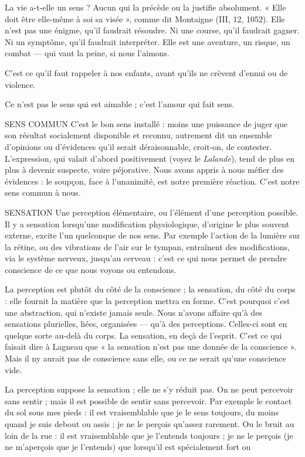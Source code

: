 La vie a-t-elle un sens ? Aucun qui la précède ou la justifie absolument.
« Elle doit être elle-même à soi sa visée », comme dit Montaigne (III, 12,
1052). Elle n’est pas une énigme, qu’il faudrait résoudre. Ni une course, qu’il
faudrait gagner. Ni un symptôme, qu’il faudrait interpréter. Elle est une aventure,
un risque, un combat — qui vaut la peine, si nous l’aimons.

C’est ce qu’il faut rappeler à nos enfants, avant qu’ils ne crèvent d’ennui ou
de violence.

Ce n’est pas le sens qui est aimable ; c’est l'amour qui fait sens.

SENS COMMUN C'est le bon sens installé : moins une puissance de juger
que son résultat socialement disponible et reconnu, autrement
dit un ensemble d’opinions ou d’évidences qu’il serait déraisonnable,
croit-on, de contester. L'expression, qui valait d’abord positivement (voyez le
{\it Lalande}), tend de plus en plus à devenir suspecte, voire péjorative. Nous avons
appris à nous méfier des évidences : le soupçon, face à l’unanimité, est notre
première réaction. C’est notre sens commun à nous.

SENSATION Une perception élémentaire, ou l'élément d’une perception
possible. Il y a sensation lorsqu'une modification physiologique,
d’origine le plus souvent externe, excite l’un quelconque de nos sens. Par
exemple l’action de la lumière sur la rétine, ou des vibrations de l'air sur le
tympan, entraînent des modifications, via le système nerveux, jusqu’au
cerveau : c’est ce qui nous permet de prendre conscience de ce que nous voyons
ou entendons.

La perception est plutôt du côté de la conscience ; la sensation, du côté du
corps : elle fournit la matière que la perception mettra en forme. C’est pourquoi
c’est une abstraction, qui n’existe jamais seule. Nous n’avons affaire qu'à
des sensations plurielles, liées, organisées — qu’à des perceptions. Celles-ci sont
en quelque sorte au-delà du corps. La sensation, en deçà de l'esprit. C’est ce qui
faisait dire à Lagneau que « la sensation n’est pas une donnée de la conscience ».
Mais il ny aurait pas de conscience sans elle, ou ce ne serait qu’une conscience
vide.

La perception suppose la sensation ; elle ne s’y réduit pas. On ne peut percevoir
sans sentir ; mais il est possible de sentir sans percevoir. Par exemple le
contact du sol sous mes pieds : il est vraisemblable que je le sens toujours, du
moins quand je suis debout ou assis ; je ne le perçois qu’assez rarement. Ou le
bruit au loin de la rue : il est vraisemblable que je l’entends toujours ; je ne le
perçois (je ne m'aperçois que je l’entends) que lorsqu'il est spécialement fort ou

